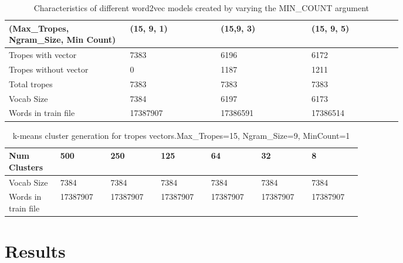 \documentclass[letterpaper]{article}
\begin{document}
	\begin{table}[t]
		\centering
		\begin{tabular}{|p{0.24\linewidth}|p{0.18\linewidth}|p{0.18\linewidth}|p{0.18\linewidth}|}
			\hline
			\textbf{(Max\_Tropes, Ngram\_Size, Min Count)}& \textbf{(15, 9, 1)} & \textbf{(15,9, 3)} & \textbf{(15, 9, 5)}\\
			\hline
			\hline
			Tropes with vector&7383  & 6196 & 6172 \\
			\hline
			Tropes without vector& 0 & 1187 & 1211 \\
			\hline
			Total tropes&7383&7383&7383\\
			\hline
		    Vocab Size& 7384 & 6197 & 6173 \\
			\hline
			Words in train file& 17387907 & 17386591 & 17386514 \\
			\hline 
			
		\end{tabular}
		\caption{Characteristics of different word2vec models created by varying the MIN\_COUNT argument}
		\label{tab:variations-with-min-count-argument-15-9}
	\end{table}	
	

	

	
	\begin{table}[ht]
		\centering
		\begin{tabular}{|p{0.1\linewidth}|p{0.1\linewidth}|p{0.1\linewidth}|p{0.1\linewidth}|p{0.1\linewidth}|p{0.1\linewidth}|p{0.1\linewidth}|}
			\hline
			\textbf{Num Clusters}& \textbf{500} & \textbf{250} & \textbf{125} & \textbf{64} & \textbf{32} & \textbf{8}\\
			\hline
			\hline
			Vocab Size& 7384 & 7384 & 7384 & 7384 & 7384 & 7384\\
			\hline
			Words in train file& 17387907 & 17387907 & 17387907 & 17387907 & 17387907 & 17387907\\
			\hline
			
		\end{tabular}
		\caption{k-means cluster generation for tropes vectors.Max\_Tropes=15, Ngram\_Size=9, MinCount=1}
		\label{tab:k-means-clusters}
	\end{table}	
	
	
	
	\section{Results}
	\label{sec:res}
	
\end{document}
